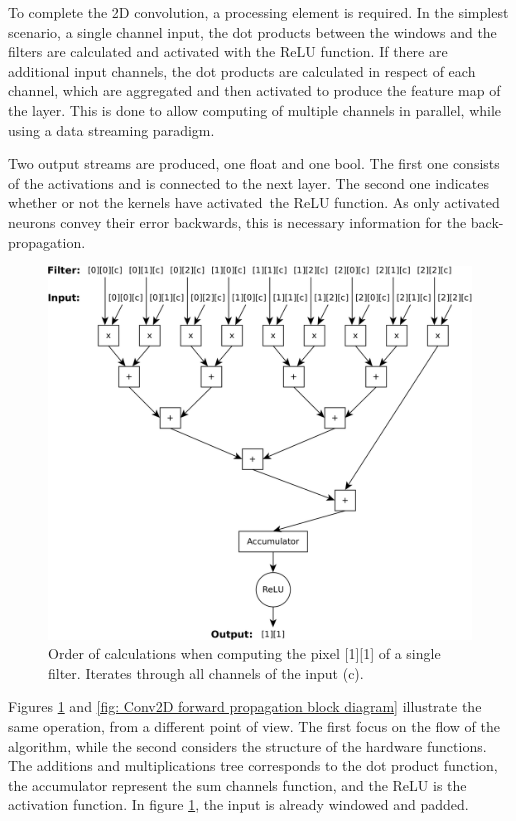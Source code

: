 To complete the 2D convolution, a processing element is required. In the simplest scenario, a single channel input, the dot products between the windows and the filters are calculated and activated with the ReLU function. If there are additional input channels, the dot products are calculated in respect of each channel, which are aggregated and then activated to produce the feature map of the layer. This is done to allow computing of multiple channels in parallel, while using a data streaming paradigm.

Two output streams are produced, one float and one bool. The first one consists of the activations and is connected to the next layer. The second one indicates whether or not the kernels have activated the ReLU function. As only activated neurons convey their error backwards, this is necessary information for the back-propagation.

\begin{figure}[H]
    \centering
        \includegraphics[width=1\textwidth]{Images/block_diagrams/conv_mc_order_calculations.png}
        \decoRule
        \caption[Conv2D order of calculations]{Order of calculations when computing the pixel [1][1] of a single filter. Iterates through all channels of the input (c).}
        \label{fig: Conv2D order of calculations}
\end{figure}

Figures \ref{fig: Conv2D order of calculations} and \ref{fig: Conv2D forward propagation block diagram} illustrate the same operation, from a different point of view. The first focus on the flow of the algorithm, while the second considers the structure of the hardware functions. The additions and multiplications tree corresponds to the dot product function, the accumulator represent the sum channels function, and the ReLU is the activation function. In figure \ref{fig: Conv2D order of calculations}, the input is already windowed and padded.

